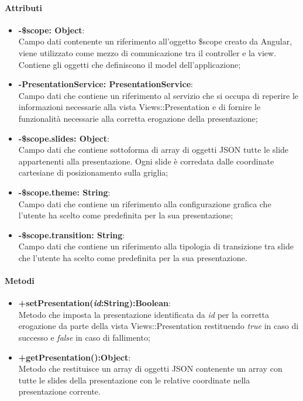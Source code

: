 	\paragraph{Attributi}
	\begin{itemize}
		\item \textbf{-\$scope: Object}:\\
			Campo dati contenente un riferimento all'oggetto \$scope creato da Angular, viene utilizzato come mezzo di comunicazione tra il controller e la view. Contiene gli oggetti che definiscono il model dell'applicazione;
		\item \textbf{-PresentationService: PresentationService}:\\
			Campo dati che contiene un riferimento al servizio che si occupa di reperire le informazioni necessarie alla vista Views::Presentation e di fornire le funzionalità necessarie alla corretta erogazione della presentazione;
		\item \textbf{-\$scope.slides: Object}:\\
			Campo dati che contiene sottoforma di array di oggetti JSON tutte le slide appartenenti alla presentazione. Ogni slide è corredata dalle coordinate cartesiane di posizionamento sulla griglia;

		\item \textbf{-\$scope.theme: String}:\\
			Campo dati che contiene un riferimento alla configurazione grafica che l'utente ha scelto come predefinita per la sua presentazione;

		\item \textbf{-\$scope.transition: String}:\\
			Campo dati che contiene un riferimento alla tipologia di transizione tra slide che l'utente ha scelto come predefinita per la sua presentazione.
	\end{itemize}

	\paragraph{Metodi}
	\begin{itemize}
	  \item \textbf{+setPresentation(\textit{id}:String):Boolean}:\\
		  Metodo che imposta la presentazione identificata da  \textit{id} per la corretta erogazione da parte della vista Views::Presentation restituendo \textit{true} in caso di successo e \textit{false} in caso di fallimento;
	  \item \textbf{+getPresentation():Object}:\\
		  Metodo che restituisce un array di oggetti JSON contenente un array con tutte le slides della presentazione con le relative coordinate nella presentazione corrente.

	\end{itemize}
